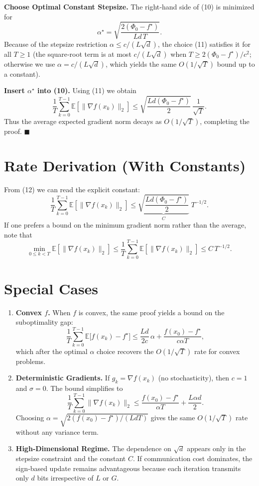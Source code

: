 \documentclass{article}
\newcommand{\E}{\mathbb{E}}
\begin{document}
\begin{enumerate}[label={[\textbf{Step \arabic*}]}, leftmargin=*, itemsep=4pt]
\item \textbf{Choose Optimal Constant Stepsize.}  
The right‑hand side of (10) is minimized for
\[
\alpha^{\star}= \sqrt{\frac{2(\Phi_0-f^\star)}{L d\,T}}. \tag{11}
\]
Because of the stepsize restriction $\alpha\le c/(L\sqrt{d})$, the choice (11) satisfies it for all $T\ge1$ (the square‑root term is at most $c/(L\sqrt{d})$ when $T\ge 2(\Phi_0-f^\star)/c^{2}$; otherwise we use $\alpha=c/(L\sqrt{d})$, which yields the same $O(1/\sqrt{T})$ bound up to a constant).

\item \textbf{Insert $\alpha^{\star}$ into (10).}  
Using (11) we obtain
\[
\frac{1}{T}\sum_{k=0}^{T-1}\E\!\left[\|\nabla f(x_k)\|_{2}\right]
\le \sqrt{\frac{L d(\Phi_0-f^\star)}{2}}\,\frac{1}{\sqrt{T}}. \tag{12}
\]
Thus the average expected gradient norm decays as $O(1/\sqrt{T})$, completing the proof. \hfill $\blacksquare$
\end{enumerate}

\section*{Rate Derivation (With Constants)}
From (12) we can read the explicit constant:
\[
\boxed{
\frac{1}{T}\sum_{k=0}^{T-1}\E\!\left[\|\nabla f(x_k)\|_{2}\right]
\le 
\underbrace{\sqrt{\frac{L d(\Phi_0-f^\star)}{2}}}_{\displaystyle C}
\;T^{-1/2}}.
\]
If one prefers a bound on the minimum gradient norm rather than the average, note that
\[
\min_{0\le k<T}\E\!\left[\|\nabla f(x_k)\|_{2}\right]
\le \frac{1}{T}\sum_{k=0}^{T-1}\E\!\left[\|\nabla f(x_k)\|_{2}\right]
\le C\,T^{-1/2}.
\]

\section*{Special Cases}
\begin{enumerate}[label={S\arabic*.}, leftmargin=*, itemsep=2pt]
\item \textbf{Convex $f$.} When $f$ is convex, the same proof yields a bound on the suboptimality gap:
\[
\frac{1}{T}\sum_{k=0}^{T-1}\E\!\big[f(x_k)-f^\star\big]
\le \frac{L d}{2c}\,\alpha +\frac{f(x_0)-f^\star}{c\alpha T},
\]
which after the optimal $\alpha$ choice recovers the $O(1/\sqrt{T})$ rate for convex problems.

\item \textbf{Deterministic Gradients.} If $g_k=\nabla f(x_k)$ (no stochasticity), then $c=1$ and $\sigma=0$. The bound simplifies to
\[
\frac{1}{T}\sum_{k=0}^{T-1}\|\nabla f(x_k)\|_{2}
\le \frac{f(x_0)-f^\star}{\alpha T}+\frac{L\alpha d}{2}.
\]
Choosing $\alpha=\sqrt{2(f(x_0)-f^\star)/(L d T)}$ gives the same $O(1/\sqrt{T})$ rate without any variance term.

\item \textbf{High‑Dimensional Regime.} The dependence on $\sqrt{d}$ appears only in the stepsize constraint and the constant $C$. If communication cost dominates, the sign‑based update remains advantageous because each iteration transmits only $d$ bits irrespective of $L$ or $G$.

\end{enumerate}
\end{document}
